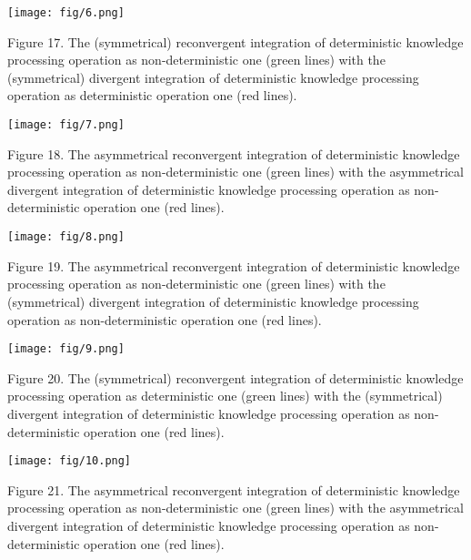 \documentclass{article}
\begin{document}
\begin{multicols}{2}
\begin{center}
\texttt{[image: fig/6.png]}
\end{center}
\vspace{0.5pt}
\scriptsize Figure 17. The (symmetrical) reconvergent integration of deterministic
knowledge processing operation as non-deterministic one (green lines)
with the (symmetrical) divergent integration of deterministic knowledge
processing operation as deterministic operation one (red lines).

\begin{center}
\texttt{[image: fig/7.png]}
\end{center}
\vspace{0.5pt}
\scriptsize Figure 18. The asymmetrical reconvergent integration of deterministic
knowledge processing operation as non-deterministic one (green lines)
with the asymmetrical divergent integration of deterministic knowledge
processing operation as non-deterministic operation one (red lines).

\begin{center}
\texttt{[image: fig/8.png]}
\end{center}
\vspace{0.5pt}
\scriptsize Figure 19. The asymmetrical reconvergent integration of deterministic
knowledge processing operation as non-deterministic one (green lines)
with the (symmetrical) divergent integration of deterministic knowledge
processing operation as non-deterministic operation one (red lines).

\begin{center}
\texttt{[image: fig/9.png]}
\end{center}
\vspace{0.5pt}
\scriptsize Figure 20. The (symmetrical) reconvergent integration of deterministic
knowledge processing operation as deterministic one (green lines) with
the (symmetrical) divergent integration of deterministic knowledge
processing operation as non-deterministic operation one (red lines).


\begin{center}
\texttt{[image: fig/10.png]}
\end{center}
\vspace{0.5pt}
\scriptsize Figure 21. The asymmetrical reconvergent integration of deterministic
knowledge processing operation as non-deterministic one (green lines)
with the asymmetrical divergent integration of deterministic knowledge
processing operation as non-deterministic operation one (red lines).




\end{multicols}
\end{document}
